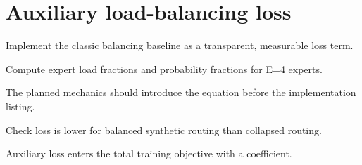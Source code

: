 \section{Auxiliary load-balancing loss}
\label{sec:ch07-auxiliary-load-balancing-loss}

Implement the classic balancing baseline as a transparent, measurable loss term.



Compute expert load fractions and probability fractions for E=4 experts.



The planned mechanics should introduce the equation before the implementation listing.





\begin{checkpointbox}
Check loss is lower for balanced synthetic routing than collapsed routing.
\end{checkpointbox}

Auxiliary loss enters the total training objective with a coefficient.
